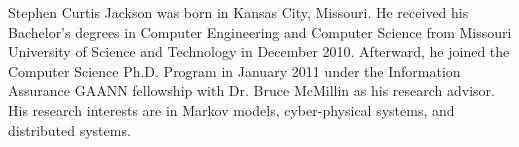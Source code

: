 Stephen Curtis Jackson was born in Kansas City, Missouri.
He received his Bachelor's degrees in Computer Engineering and Computer Science from Missouri University of Science and Technology in December 2010.
Afterward, he joined the Computer Science Ph.D. Program in January 2011 under the Information Assurance GAANN fellowship with Dr. Bruce McMillin as his research advisor.
His research interests are in Markov models, cyber-physical systems, and distributed systems.
